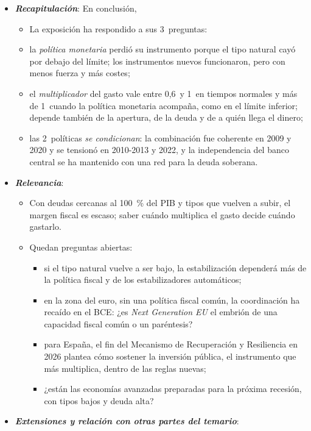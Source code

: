 \documentclass[11pt]{article}
\begin{document}
\begin{itemize}
\item \textbf{\emph{Recapitulación}}: En conclusión,
  \begin{itemize}
  \item La exposición ha respondido a sus 3~preguntas:
  \item la \emph{política monetaria} perdió su instrumento porque el tipo natural cayó por debajo del límite; los instrumentos nuevos funcionaron, pero con menos fuerza y más costes;
  \item el \emph{multiplicador} del gasto vale entre 0,6~y 1~en tiempos normales y más de 1~cuando la política monetaria acompaña, como en el límite inferior; depende también de la apertura, de la deuda y de a quién llega el dinero;
  \item las 2~políticas \emph{se condicionan}: la combinación fue coherente en 2009 y 2020 y se tensionó en 2010-2013 y 2022, y la independencia del banco central se ha mantenido con una red para la deuda soberana.
  \end{itemize}
\item \textbf{\emph{Relevancia}}:
  \begin{itemize}
  \item Con deudas cercanas al 100~\% del PIB y tipos que vuelven a subir, el margen fiscal es escaso; saber cuándo multiplica el gasto decide cuándo gastarlo.
  \item Quedan preguntas abiertas:
    \begin{itemize}
    \item si el tipo natural vuelve a ser bajo, la estabilización dependerá más de la política fiscal y de los estabilizadores automáticos;
    \item en la zona del euro, sin una política fiscal común, la coordinación ha recaído en el BCE: ¿es \emph{Next Generation EU} el embrión de una capacidad fiscal común o un paréntesis?
    \item para España, el fin del Mecanismo de Recuperación y Resiliencia en 2026 plantea cómo sostener la inversión pública, el instrumento que más multiplica, dentro de las reglas nuevas;
    \item ¿están las economías avanzadas preparadas para la próxima recesión, con tipos bajos y deuda alta?
    \end{itemize}
  \end{itemize}
\item \textbf{\emph{Extensiones y relación con otras partes del temario}}:
  \begin{itemize}

\end{itemize}
\end{itemize}
\end{document}

